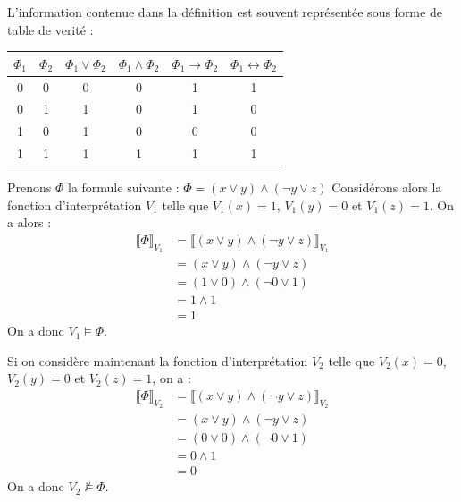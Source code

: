 L'information contenue dans la définition est souvent représentée sous forme de table de verité : 
\begin{center}
  \begin{tabular}{|c|c|c|c|c|c|}
    \hline 
    $\Phi_1$ & $\Phi_2$ & $\Phi_1\vee\Phi_2$ & $\Phi_1\wedge\Phi_2$ & $\Phi_1\rightarrow\Phi_2$ & $\Phi_1\leftrightarrow\Phi_2$ \\ 
    \hline 
    0 & 0 & 0 & 0 & 1 & 1 \\ 
    \hline 
    0 & 1 & 1 & 0 & 1 & 0 \\ 
    \hline 
    1 & 0 & 1 & 0 & 0 & 0 \\ 
    \hline 
    1 & 1 & 1 & 1 & 1 & 1 \\ 
    \hline 
  \end{tabular}
\end{center}

\begin{example}\leavevmode
  Prenons $\Phi$ la formule suivante : $\Phi = (x\vee y) \wedge (\neg y \vee z)$
  Considérons alors la fonction d'interprétation $V_1$ telle que $V_1(x)=1$, $V_1(y)=0$ et $V_1(z)=1$.
  On a alors : 
  \begin{align*}
    \llbracket\Phi\rrbracket_{V_1} &= \llbracket(x\vee y)\wedge(\neg y\vee z)\rrbracket_{V_1} \\
                                   &= (x\vee y) \wedge (\neg y \vee z) \\ 
                                   &= (1\vee 0) \wedge (\neg 0 \vee 1) \\ 
                                   &= 1 \wedge 1 \\ 
                                   &= 1
  \end{align*}
  On a donc $V_1\vDash\Phi$. 

  Si on considère maintenant la fonction d'interprétation $V_2$ telle que $V_2(x)=0$, $V_2(y)=0$ et $V_2(z)=1$, on a :
  \begin{align*}
    \llbracket\Phi\rrbracket_{V_2} &= \llbracket(x\vee y)\wedge(\neg y\vee z)\rrbracket_{V_2} \\
                                   &= (x\vee y) \wedge (\neg y \vee z) \\ 
                                   &= (0\vee 0) \wedge (\neg 0 \vee 1) \\ 
                                   &= 0 \wedge 1 \\ 
                                   &= 0 
  \end{align*} 
  On a donc $V_2\nvDash\Phi$.
\end{example}

